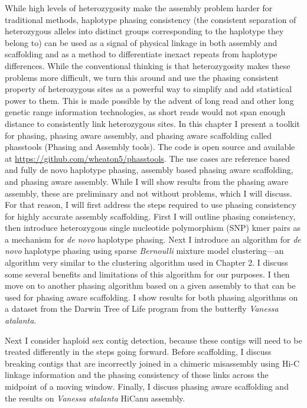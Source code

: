 \par{
While high levels of heterozygosity make the assembly problem harder for traditional methods, haplotype phasing consistency (the consistent separation of heterozygous alleles into distinct groups corresponding to the haplotype they belong to) can be used as a signal of physical linkage in both assembly and scaffolding and as a method to differentiate inexact repeats from haplotype differences. While the conventional thinking is that heterozygosity makes these problems more difficult, we turn this around and use the phasing consistent property of heterozygous sites as a powerful way to simplify and add statistical power to them. This is made possible by the advent of long read and other long genetic range information technologies, as short reads would not span enough distance to consistently link heterozygous sites. In this chapter I present a toolkit for phasing, phasing aware assembly, and phasing aware scaffolding called phasstools (Phasing and Assembly tools). The code is open source and available at \href{https://github.com/wheaton5/phasstools}{https://github.com/wheaton5/phasstools}. The use cases are reference based and fully de novo haplotype phasing, assembly based phasing aware scaffolding, and phasing aware assembly. While I will show results from the phasing aware assembly, these are preliminary and not without problems, which I will discuss. For that reason, I will first address the steps required to use phasing consistency for highly accurate assembly scaffolding. First I will outline phasing consistency, then introduce heterozygous single nucleotide polymorphism (SNP) kmer pairs as a mechanism for \textit{de novo} haplotype phasing. Next I introduce an algorithm for \textit{de novo} haplotype phasing using sparse \textit{Bernoulli} mixture model clustering---an algorithm very similar to the clustering algorithm used in Chapter 2. I discuss some several benefits and limitations of this algorithm for our purposes. I then move on to another phasing algorithm based on a given assembly to that can be used for phasing aware scaffolding. I show results for both phasing algorithms on a dataset from the Darwin Tree of Life program from the butterfly \textit{Vanessa atalanta}. }

\par{
Next I consider haploid sex contig detection, because these contigs will need to be treated differently in the steps going forward. Before scaffolding, I discuss breaking contigs that are incorrectly joined in a chimeric misassembly using Hi-C linkage information and the phasing consistency of those links across the midpoint of a moving window. Finally, I discuss phasing aware scaffolding and the results on \textit{Vanessa atalanta} HiCanu assembly. }

